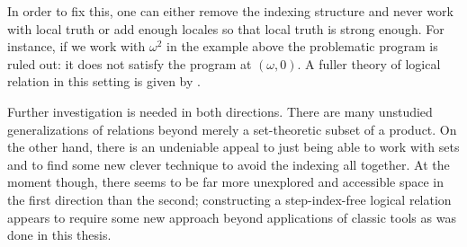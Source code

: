 In order to fix this, one can either remove the indexing structure and
never work with local truth or add enough locales so that local truth
is strong enough. For instance, if we work with $\omega^2$ in the
example above the problematic program is ruled out: it does not
satisfy the program at $(\omega, 0)$. A fuller theory of logical
relation in this setting is given by \citet{Svendsen:16}.

Further investigation is needed in both directions. There are many
unstudied generalizations of relations beyond merely a set-theoretic
subset of a product. On the other hand, there is an undeniable appeal to
just being able to work with sets and to find some new clever
technique to avoid the indexing all together. At the moment though,
there seems to be far more unexplored and accessible space in the
first direction than the second; constructing a step-index-free
logical relation appears to require some new approach beyond
applications of classic tools as was done in this thesis.

